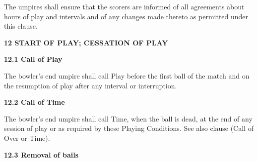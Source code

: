 \documentclass[12pt]{article}
\begin{document}
\vspace{\baselineskip}
\begin{adjustwidth}{0.0in}{0.01in}
{\fontsize{9pt}{10.8pt}\selectfont The umpires shall ensure that the scorers are informed of all agreements about hours of play and intervals and of any changes made thereto as permitted under this clause.\par}\par

\end{adjustwidth}


\vspace{\baselineskip}
{\fontsize{16pt}{19.2pt}\selectfont \textbf{12 START OF PLAY; CESSATION OF PLAY}\par}\par


\vspace{\baselineskip}
{\fontsize{11pt}{13.2pt}\selectfont \textbf{12.1 \tabto{0.47in} Call of Play}\par}\par


\vspace{\baselineskip}
\begin{adjustwidth}{0.0in}{0.35in}
{\fontsize{9pt}{10.8pt}\selectfont The bowler’s end umpire shall call Play before the first ball of the match and on the resumption of play after any interval or interruption.\par}\par

\end{adjustwidth}


\vspace{\baselineskip}
{\fontsize{11pt}{13.2pt}\selectfont \textbf{12.2 \tabto{0.47in} Call of Time}\par}\par


\vspace{\baselineskip}
\begin{adjustwidth}{0.0in}{0.22in}
{\fontsize{9pt}{10.8pt}\selectfont The bowler’s end umpire shall call Time, when the ball is dead, at the end of any session of play or as required by these Playing Conditions. See also clause (Call of Over or Time).\par}\par

\end{adjustwidth}


\vspace{\baselineskip}
{\fontsize{11pt}{13.2pt}\selectfont \textbf{12.3 \tabto{0.47in} Removal of bails}\par}\par
\end{document}
